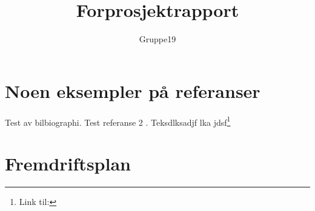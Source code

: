 \documentclass[11pt,a4paper,titlepage]{report}
\author{Gruppe19}
\title{Forprosjektrapport}
\begin{document}
\maketitle
\tableofcontents









\chapter{Noen eksempler på referanser}
Test av bilbiographi\cite{book:unixprog}.
Test referanse 2 \cite{book:unixprog2}.
Teksdlksadjf lka jdsf\footnote{Link til:}





\appendix
\chapter{Fremdriftsplan}
\end{document}
